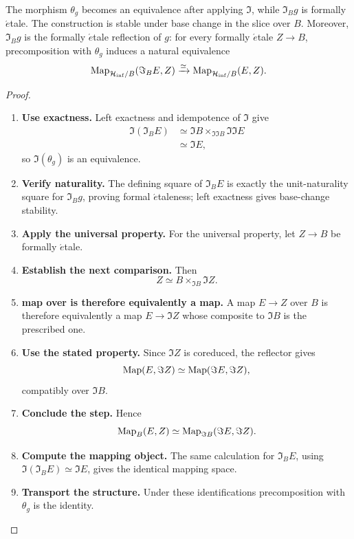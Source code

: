 \begin{proposition}
\label{prop:infinitesimal-shape-factorization}
The morphism \(\theta_g\) becomes an equivalence after applying \(\Im\), while
\(\Im_Bg\) is formally \(\acute{e}\)tale. The construction is stable under
base change in the slice over \(B\). Moreover, \(\Im_Bg\) is the formally
\(\acute{e}\)tale reflection of \(g\): for every formally \(\acute{e}\)tale
\(Z\to B\), precomposition with \(\theta_g\) induces a natural equivalence
\[
    \operatorname{Map}_{\mathcal H_{\inf}/B}(\Im_BE,Z)
    \xrightarrow{\simeq}
    \operatorname{Map}_{\mathcal H_{\inf}/B}(E,Z).
\]
\end{proposition}

\begin{proof}
\leavevmode
\begin{enumerate}[label=\textup{(\arabic*)}]
    \item \textbf{Use exactness.}
    Left exactness and idempotence of \(\Im\) give
    \[
    \begin{aligned}
        \Im(\Im_BE)
        &\simeq
        \Im B\times_{\Im\Im B}\Im\Im E
        \\
        &\simeq
        \Im E,
    \end{aligned}
    \]
    so \(\Im(\theta_g)\) is an equivalence.

    \item \textbf{Verify naturality.}
    The defining square of \(\Im_BE\) is exactly the unit-naturality square for \(\Im_Bg\),
    proving formal \(\acute{e}\)taleness; left exactness gives base-change stability.

    \item \textbf{Apply the universal property.}
    For the universal property, let \(Z\to B\) be formally \(\acute{e}\)tale.

    \item \textbf{Establish the next comparison.}
    Then
    \[
        Z\simeq B\times_{\Im B}\Im Z.
    \]

    \item \textbf{map over is therefore equivalently a map.}
    A map \(E\to Z\) over \(B\) is therefore equivalently a map \(E\to\Im Z\) whose
    composite to \(\Im B\) is the prescribed one.

    \item \textbf{Use the stated property.}
    Since \(\Im Z\) is coreduced, the reflector gives
    \[
        \operatorname{Map}(E,\Im Z)\simeq\operatorname{Map}(\Im E,\Im Z),
    \]
    compatibly over \(\Im B\).

    \item \textbf{Conclude the step.}
    Hence
    \[
        \operatorname{Map}_B(E,Z)
        \simeq
        \operatorname{Map}_{\Im B}(\Im E,\Im Z).
    \]

    \item \textbf{Compute the mapping object.}
    The same calculation for \(\Im_BE\), using \(\Im(\Im_BE)\simeq\Im E\), gives the identical mapping space.

    \item \textbf{Transport the structure.}
    Under these identifications precomposition with \(\theta_g\) is the identity.
\end{enumerate}
\end{proof}

